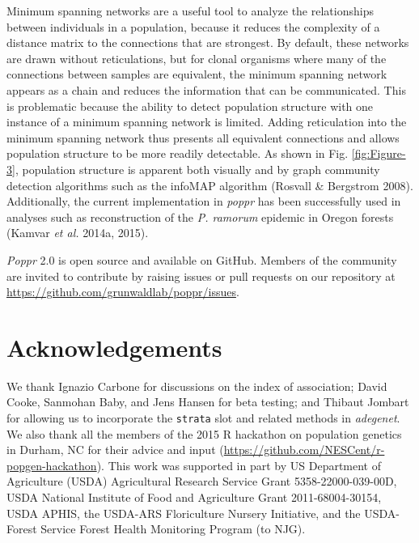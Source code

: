 \documentclass[double,12pt]{beavtex}
\begin{document}
  Minimum spanning networks are a useful tool to analyze the relationships
  between individuals in a population, because it reduces the complexity
  of a distance matrix to the connections that are strongest. By default,
  these networks are drawn without reticulations, but for clonal organisms
  where many of the connections between samples are equivalent, the
  minimum spanning network appears as a chain and reduces the information
  that can be communicated. This is problematic because the ability to
  detect population structure with one instance of a minimum spanning
  network is limited. Adding reticulation into the minimum spanning
  network thus presents all equivalent connections and allows population
  structure to be more readily detectable. As shown in Fig.
  \ref{fig:Figure-3}, population structure is apparent both visually and
  by graph community detection algorithms such as the infoMAP algorithm
  (Rosvall \& Bergstrom 2008). Additionally, the current implementation in
  \emph{poppr} has been successfully used in analyses such as
  reconstruction of the \emph{P. ramorum} epidemic in Oregon forests
  (Kamvar \emph{et al.} 2014a, 2015).
  
  \emph{Poppr} 2.0 is open source and available on GitHub. Members of the
  community are invited to contribute by raising issues or pull requests
  on our repository at \url{https://github.com/grunwaldlab/poppr/issues}.
  
  \newpage
  
  \section{Acknowledgements}\label{acknowledgements}
  
  We thank Ignazio Carbone for discussions on the index of association;
  David Cooke, Sanmohan Baby, and Jens Hansen for beta testing; and
  Thibaut Jombart for allowing us to incorporate the \texttt{strata} slot
  and related methods in \emph{adegenet}. We also thank all the members of
  the 2015 R hackathon on population genetics in Durham, NC for their
  advice and input (\url{https://github.com/NESCent/r-popgen-hackathon}).
  This work was supported in part by US Department of Agriculture (USDA)
  Agricultural Research Service Grant 5358-22000-039-00D, USDA National
  Institute of Food and Agriculture Grant 2011-68004-30154, USDA APHIS,
  the USDA-ARS Floriculture Nursery Initiative, and the USDA-Forest
  Service Forest Health Monitoring Program (to NJG).
  
\end{document}
